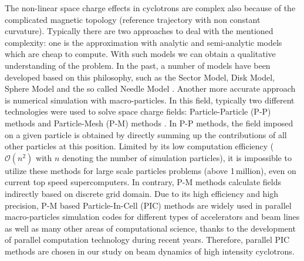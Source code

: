 \documentclass[aps,prstab,twocolumn,superscriptaddress]{revtex4}
\begin{document}
The non-linear space charge effects in cyclotrons are complex also because of the complicated magnetic topology (reference trajectory with non constant
curvature). Typically there are two approaches 
to deal with the mentioned complexity: one is the approximation with analytic and semi-analytic models which are cheap to compute. With such models we can obtain a qualitative  
understanding of the problem. %
In the past, a number of models have been developed based on this philosophy, such as the Sector Model, Disk Model, Sphere Model and the so called Needle Model \cite{Gordon:1,Joho:1,Adam:1,Adam:2}. 
Another more accurate approach is numerical simulation with macro-particles. In this field, typically two different technologies were used to 
solve space charge fields: Particle-Particle (P-P) methods \cite{Li:1} and Particle-Mesh (P-M) methods \cite{Ada:1,Poz:1}. In P-P methods, the field imposed on 
a given particle is obtained by directly summing up the contributions of all other particles at this position. Limited by its low computation efficiency ($\mathcal{O}(n^2)$ with $n$ denoting the number of simulation particles), 
it is impossible to utilize these methods for large scale particles problems (above 1\,million), even on current top speed supercomputers. In contrary, P-M methods
calculate fields indirectly based on discrete grid domain. Due to its high efficiency and high precision, P-M based Particle-In-Cell (PIC) methods\cite{Hockney:1} 
are widely used in parallel macro-particles simulation codes for different types of accelerators and beam lines \cite{Ada:1,Qiang:1,Gala:1,Grote:1,Huang:1} 
as well as many other areas of computational science, thanks to the development of parallel computation technology during recent years. Therefore, parallel PIC methods are 
chosen in our study on beam dynamics of high intensity cyclotrons.
\end{document}
